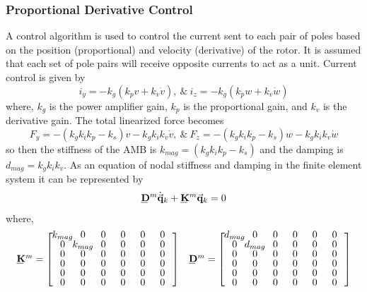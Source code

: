 \subsubsection{Proportional Derivative Control}
A control algorithm is used to control the current sent to each pair of poles based on the position (proportional) and velocity (derivative) of the rotor. It is assumed that each set of pole pairs will receive opposite currents to act as a unit. Current control is given by 
\begin{equation}\label{eq:ControlCurrent}
i_y=-k_g(k_pv+k_v\dot{v}),\ \&\ i_z=-k_g(k_pw+k_v\dot{w})
\end{equation}
where, $ k_g $ is the power amplifier gain, $ k_p $ is the proportional gain, and $ k_v $ is the derivative gain. The total linearized force becomes
\begin{equation}\label{key}
F_y=-(k_gk_ik_p-k_s)v-k_gk_ik_v\dot{v},\ \&\ F_z=-(k_gk_ik_p-k_s)w-k_gk_ik_v\dot{w}
\end{equation}
so then the stiffness of the AMB is $ k_{mag}=(k_gk_ik_p-k_s) $ and the damping is $ d_{mag}=k_gk_ik_v $. As an equation of nodal stiffness and damping in the finite element system it can be represented by
\begin{equation}\label{eq:DiskNodeEquationofMotion}
\bunderline{\mathbf{D}}^m\dot{\vec{\mathbf{q}}}_k+\bunderline{\mathbf{K}}^m\vec{\mathbf{q}}_k=0
\end{equation}
where,
\begin{equation*}
\def\cs{2em}
\begin{array}{cc}
\bunderline{\mathbf{K}}^m=\left[\def\arraystretch{.8}\arraycolsep=0pt\begin{array}{cccccc}
\makebox[\cs]{$k_{mag}$}&\makebox[\cs]{0}&\makebox[\cs]{0}&\makebox[\cs]{0}&\makebox[\cs]{0}&\makebox[\cs]{0}\\
0&k_{mag}&0&0&0&0\\
0&0&0&0&0&0\\
0&0&0&0&0&0\\
0&0&0&0&0&0\\
0&0&0&0&0&0
\end{array}\right] & \bunderline{\mathbf{D}}^m=\left[\def\arraystretch{.8}\arraycolsep=0pt\begin{array}{cccccc}
\makebox[\cs]{$d_{mag}$}&\makebox[\cs]{0}&\makebox[\cs]{0}&\makebox[\cs]{0}&\makebox[\cs]{0}&\makebox[\cs]{0}\\
0&d_{mag}&0&0&0&0\\
0&0&0&0&0&0\\
0&0&0&0&0&0\\
0&0&0&0&0&0\\
0&0&0&0&0&0
\end{array}\right]
\end{array}
\end{equation*}

